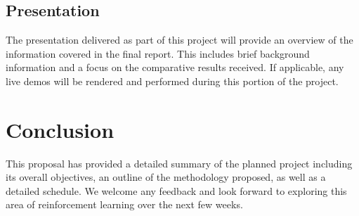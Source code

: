 \documentclass[conference]{IEEEtran}
\begin{document}
\subsection{Presentation}
The presentation delivered as part of this project will provide an overview of the information covered in the final report.
This includes brief background information and a focus on the comparative results received.
If applicable, any live demos will be rendered and performed during this portion of the project.

\section{Conclusion} \label{conclusion}
This proposal has provided a detailed summary of the planned project including its overall objectives, an outline of the methodology proposed, as well as a detailed schedule.
We welcome any feedback and look forward to exploring this area of reinforcement learning over the next few weeks.

{}


\vspace{12pt}
\end{document}
